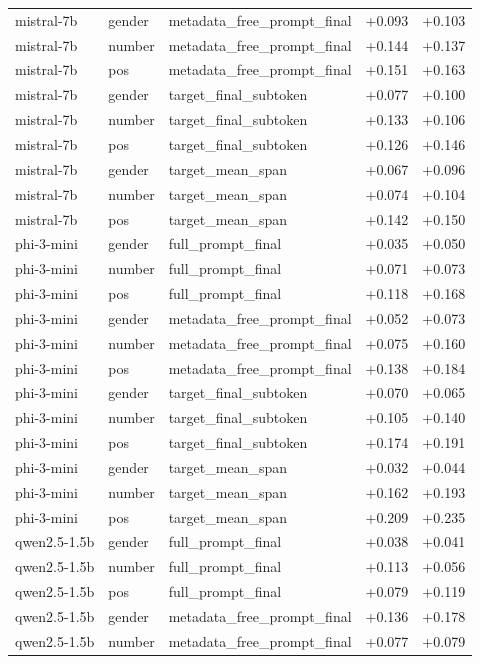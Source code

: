 \begin{tabular}{lllrr}
mistral-7b & gender & metadata_free_prompt_final & +0.093 & +0.103 \\
mistral-7b & number & metadata_free_prompt_final & +0.144 & +0.137 \\
mistral-7b & pos & metadata_free_prompt_final & +0.151 & +0.163 \\
mistral-7b & gender & target_final_subtoken & +0.077 & +0.100 \\
mistral-7b & number & target_final_subtoken & +0.133 & +0.106 \\
mistral-7b & pos & target_final_subtoken & +0.126 & +0.146 \\
mistral-7b & gender & target_mean_span & +0.067 & +0.096 \\
mistral-7b & number & target_mean_span & +0.074 & +0.104 \\
mistral-7b & pos & target_mean_span & +0.142 & +0.150 \\
phi-3-mini & gender & full_prompt_final & +0.035 & +0.050 \\
phi-3-mini & number & full_prompt_final & +0.071 & +0.073 \\
phi-3-mini & pos & full_prompt_final & +0.118 & +0.168 \\
phi-3-mini & gender & metadata_free_prompt_final & +0.052 & +0.073 \\
phi-3-mini & number & metadata_free_prompt_final & +0.075 & +0.160 \\
phi-3-mini & pos & metadata_free_prompt_final & +0.138 & +0.184 \\
phi-3-mini & gender & target_final_subtoken & +0.070 & +0.065 \\
phi-3-mini & number & target_final_subtoken & +0.105 & +0.140 \\
phi-3-mini & pos & target_final_subtoken & +0.174 & +0.191 \\
phi-3-mini & gender & target_mean_span & +0.032 & +0.044 \\
phi-3-mini & number & target_mean_span & +0.162 & +0.193 \\
phi-3-mini & pos & target_mean_span & +0.209 & +0.235 \\
qwen2.5-1.5b & gender & full_prompt_final & +0.038 & +0.041 \\
qwen2.5-1.5b & number & full_prompt_final & +0.113 & +0.056 \\
qwen2.5-1.5b & pos & full_prompt_final & +0.079 & +0.119 \\
qwen2.5-1.5b & gender & metadata_free_prompt_final & +0.136 & +0.178 \\
qwen2.5-1.5b & number & metadata_free_prompt_final & +0.077 & +0.079 \\

\end{tabular}

